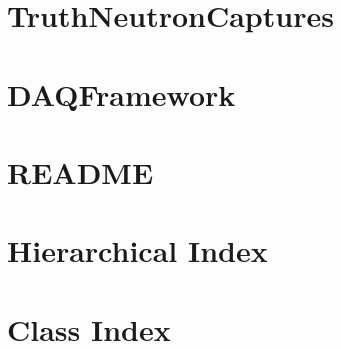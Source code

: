 \let\mypdfximage\pdfximage\def\pdfximage{\immediate\mypdfximage}\documentclass[twoside]{book}
\newcommand{\+}{\discretionary{\mbox{\scriptsize$\hookleftarrow$}}{}{}}
\begin{document}
\chapter{Truth\+Neutron\+Captures}
\label{md_UserTools_TruthNeutronCaptures_v3_README}

\chapter{DAQFramework}
\label{md_UserTools_vectgen_README}

\chapter{README}
\label{md_DataModel_README}

\chapter{Hierarchical Index}

\chapter{Class Index}

\end{document}
